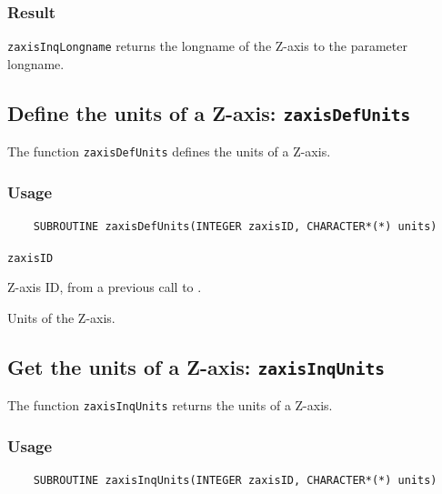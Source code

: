 \subsubsection*{Result}

{\texttt{zaxisInqLongname}} returns the longname of the Z-axis to the parameter longname.



\subsection{Define the units of a Z-axis: \texttt{zaxisDefUnits}}
\label{zaxisDefUnits}

The function {\texttt{zaxisDefUnits}} defines the units of a Z-axis.

\subsubsection*{Usage}

\begin{verbatim}
    SUBROUTINE zaxisDefUnits(INTEGER zaxisID, CHARACTER*(*) units)
\end{verbatim}

\hspace*{4mm}\begin{minipage}[]{15cm}
\begin{deflist}{\texttt{zaxisID}\ }
\item[\texttt{zaxisID}]
Z-axis ID, from a previous call to {}.
\item[\texttt{units}]
Units of the Z-axis.

\end{deflist}
\end{minipage}


\subsection{Get the units of a Z-axis: \texttt{zaxisInqUnits}}
\label{zaxisInqUnits}

The function {\texttt{zaxisInqUnits}} returns the units of a Z-axis.

\subsubsection*{Usage}

\begin{verbatim}
    SUBROUTINE zaxisInqUnits(INTEGER zaxisID, CHARACTER*(*) units)
\end{verbatim}

